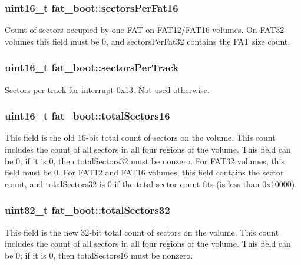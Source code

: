 \subsubsection[{\texorpdfstring{sectors\+Per\+Fat16}{sectorsPerFat16}}]{\setlength{\rightskip}{0pt plus 5cm}uint16\+\_\+t fat\+\_\+boot\+::sectors\+Per\+Fat16}\hypertarget{structfat__boot_a0d5ab13399759acfa571e49b85600db1}{}\label{structfat__boot_a0d5ab13399759acfa571e49b85600db1}
Count of sectors occupied by one F\+AT on F\+A\+T12/\+F\+A\+T16 volumes. On F\+A\+T32 volumes this field must be 0, and sectors\+Per\+Fat32 contains the F\+AT size count. 
\subsubsection[{\texorpdfstring{sectors\+Per\+Track}{sectorsPerTrack}}]{\setlength{\rightskip}{0pt plus 5cm}uint16\+\_\+t fat\+\_\+boot\+::sectors\+Per\+Track}\hypertarget{structfat__boot_a6d5ceaf374e0607be8b8162bf657f282}{}\label{structfat__boot_a6d5ceaf374e0607be8b8162bf657f282}
Sectors per track for interrupt 0x13. Not used otherwise. 
\subsubsection[{\texorpdfstring{total\+Sectors16}{totalSectors16}}]{\setlength{\rightskip}{0pt plus 5cm}uint16\+\_\+t fat\+\_\+boot\+::total\+Sectors16}\hypertarget{structfat__boot_ac8bd40dd9186882e423e10b0c83e89b7}{}\label{structfat__boot_ac8bd40dd9186882e423e10b0c83e89b7}
This field is the old 16-\/bit total count of sectors on the volume. This count includes the count of all sectors in all four regions of the volume. This field can be 0; if it is 0, then total\+Sectors32 must be nonzero. For F\+A\+T32 volumes, this field must be 0. For F\+A\+T12 and F\+A\+T16 volumes, this field contains the sector count, and total\+Sectors32 is 0 if the total sector count fits (is less than 0x10000). 
\subsubsection[{\texorpdfstring{total\+Sectors32}{totalSectors32}}]{\setlength{\rightskip}{0pt plus 5cm}uint32\+\_\+t fat\+\_\+boot\+::total\+Sectors32}\hypertarget{structfat__boot_addeb2dd8f78418edbf544303d44133e2}{}\label{structfat__boot_addeb2dd8f78418edbf544303d44133e2}
This field is the new 32-\/bit total count of sectors on the volume. This count includes the count of all sectors in all four regions of the volume. This field can be 0; if it is 0, then total\+Sectors16 must be nonzero. 
